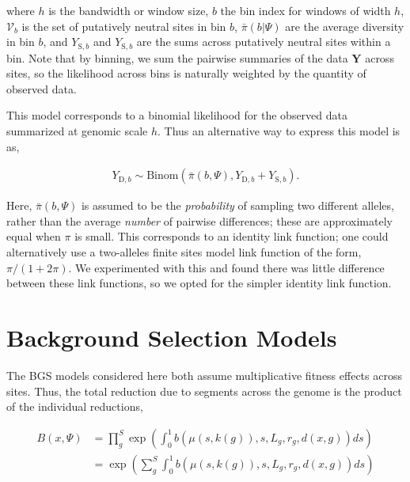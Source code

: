 \documentclass[11pt]{article}
\begin{document}
where $h$ is the bandwidth or window size, $b$ the bin index for windows of
width $h$, $\mathcal{V}_b$ is the set of putatively neutral sites in bin $b$,
$\bar{\pi}(b | \Psi)$ are the average diversity in bin $b$, and
$Y_{\text{S},b}$ and $Y_{\text{S},b}$ are the sums across putatively neutral
sites within a bin. Note that by binning, we sum the pairwise summaries of the
data $\mathbf{Y}$ across sites, so the likelihood across bins is naturally
weighted by the quantity of observed data. 



This model corresponds to a binomial likelihood for the observed data
summarized at genomic scale $h$. Thus an alternative way to express this model
is as, 

\begin{align}
  Y_{\text{D},b} \sim \text{Binom}(\bar{\pi}(b, \Psi), Y_{\text{D},b} + Y_{\text{S},b}).
\end{align}

Here, $\bar{\pi}(b, \Psi)$ is assumed to be the \emph{probability} of sampling
two different alleles, rather than the average \emph{number} of pairwise
differences; these are approximately equal when $\pi$ is small. This
corresponds to an identity link function; one could alternatively use a
two-alleles finite sites model link function of the form, $\pi/(1 + 2 \pi)$. We
experimented with this and found there was little difference between these link
functions, so we opted for the simpler identity link function.


\section{Background Selection Models}

The BGS models considered here both assume multiplicative fitness effects
across sites. Thus, the total reduction due to segments across the genome is
the product of the individual reductions, 

\begin{align}
  \label{suppeqn:b}
  B(x, \Psi) &= \prod_g^S \exp \left( \int_0^1 b(\mu(s, k(g)), s, L_g, r_g, d(x, g)) ds \right) \\
             &= \exp \left( \sum_g^S \int_0^1 b(\mu(s, k(g)), s, L_g, r_g, d(x, g)) ds \right)
\end{align}
\end{document}
